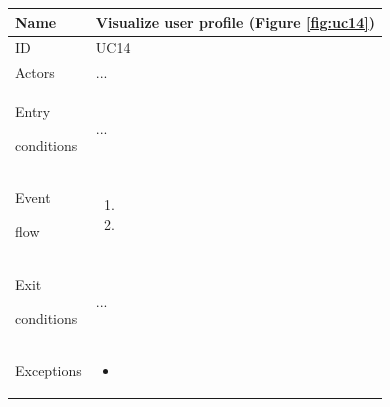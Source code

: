 \begin{center}
    \def\arraystretch{1.5}
    \begin{tabular}{| m{2cm} | m{10cm}|}
        \hline
        Name                  & Visualize user profile  (Figure \ref{fig:uc14})                                                                                                               \\ \hline
        ID                    & UC14                                                                                                                            \\ \hline
        Actors                & ... \\ \hline
        Entry \par conditions & ... \\ \hline
        Event \par flow       & \begin{enumerate}
                                    \item 
                                    \item 
                                \end{enumerate} \\ \hline
        Exit \par conditions  & ... \\ \hline
        Exceptions            & \begin{itemize}
                                    \item 
                                \end{itemize} \\ \hline
    \end{tabular}
\end{center}

